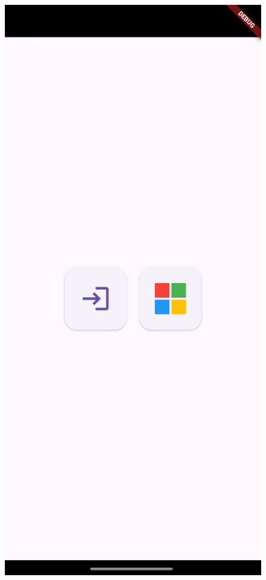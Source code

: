 \documentclass[
  digital,     %
  oneside,     %
  nosansbold,  %
  nocolorbold, %
  lof,         %
  lot,         %
]{fithesis4}
\begin{document}
\begin{center}
\begin{minipage}{0.45\textwidth}
\begin{figure}[H]
    \includegraphics[width=\textwidth]{assets/login_screen.png}

\end{figure}
\end{minipage}
\end{center}
\end{document}
